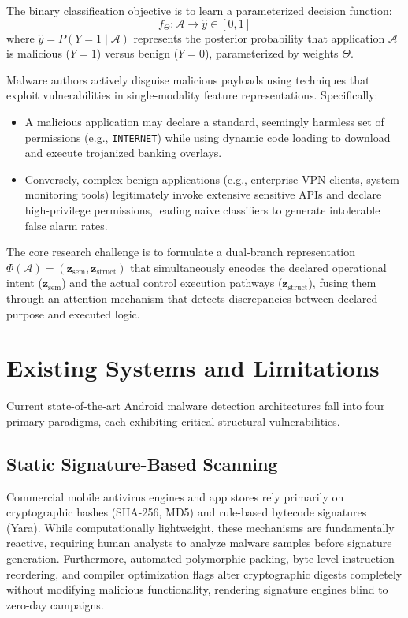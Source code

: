 \documentclass[12pt,a4paper,oneside]{report}
\begin{document}
The binary classification objective is to learn a parameterized decision function:
\begin{equation}
    f_{\Theta}: \mathcal{A} \longrightarrow \hat{y} \in [0, 1]
\end{equation}
where $\hat{y} = P(Y = 1 \mid \mathcal{A})$ represents the posterior probability that application $\mathcal{A}$ is malicious ($Y = 1$) versus benign ($Y = 0$), parameterized by weights $\Theta$. 

Malware authors actively disguise malicious payloads using techniques that exploit vulnerabilities in single-modality feature representations. Specifically:
\begin{itemize}
    \item A malicious application may declare a standard, seemingly harmless set of permissions (e.g., \texttt{INTERNET}) while using dynamic code loading to download and execute trojanized banking overlays.
    \item Conversely, complex benign applications (e.g., enterprise VPN clients, system monitoring tools) legitimately invoke extensive sensitive APIs and declare high-privilege permissions, leading naive classifiers to generate intolerable false alarm rates.
\end{itemize}

The core research challenge is to formulate a dual-branch representation $\Phi(\mathcal{A}) = \left(\mathbf{z}_{\text{sem}}, \mathbf{z}_{\text{struct}}\right)$ that simultaneously encodes the declared operational intent ($\mathbf{z}_{\text{sem}}$) and the actual control execution pathways ($\mathbf{z}_{\text{struct}}$), fusing them through an attention mechanism that detects discrepancies between declared purpose and executed logic.

\section{Existing Systems and Limitations}
Current state-of-the-art Android malware detection architectures fall into four primary paradigms, each exhibiting critical structural vulnerabilities.

\subsection{Static Signature-Based Scanning}
Commercial mobile antivirus engines and app stores rely primarily on cryptographic hashes (SHA-256, MD5) and rule-based bytecode signatures (Yara). While computationally lightweight, these mechanisms are fundamentally reactive, requiring human analysts to analyze malware samples before signature generation. Furthermore, automated polymorphic packing, byte-level instruction reordering, and compiler optimization flags alter cryptographic digests completely without modifying malicious functionality, rendering signature engines blind to zero-day campaigns.
\end{document}
